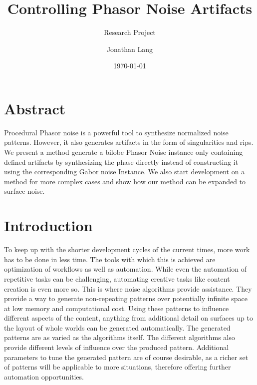 \documentclass{utue} %
\title{Controlling Phasor Noise Artifacts}
\author{Jonathan Lang}
\date{\today}
\subtitle{Research Project}
\begin{document}

\maketitle 
 
\section*{Abstract}  
Procedural Phasor noise is a powerful tool to synthesize normalized noise patterns. However, it also generates artifacts in the form of singularities and rips. We present a method generate a bilobe Phasor Noise instance only containing defined artifacts by synthesizing the phase directly instead of constructing it using the corresponding Gabor noise Instance. We also start development on a method for more complex cases and show how our method can be expanded to surface noise.
  
\section{Introduction}   
To keep up with the shorter development cycles of the current times, more work has to be done in less time. The tools with which this is achieved are optimization of workflows as well as automation. While even the automation of repetitive tasks can be challenging, automating creative tasks like content creation is even more so. This is where noise algorithms provide assistance. They provide a way to generate non-repeating patterns over potentially infinite space at low memory and computational cost. Using these patterns to influence different aspects of the content, anything from additional detail on surfaces up to the layout of whole worlds can be generated automatically. The generated patterns are as varied as the algorithms itself. The different algorithms also provide different levels of influence over the produced pattern. Additional parameters to tune the generated pattern are of course desirable, as a richer set of patterns will be applicable to more situations, therefore offering further automation opportunities.
\end{document}
